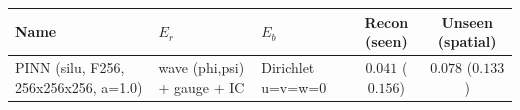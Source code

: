 \begin{center}
\begin{tabular}{lll cc}
\toprule
Name & $E_r$ & $E_b$ & Recon (seen) & Unseen (spatial) \\
\midrule
PINN (silu, F256, 256x256x256, a=1.0) & wave (phi,psi) + gauge + IC & Dirichlet u=v=w=0 & $0.041$ ($0.156$) & $0.078$ ($0.133$) \\
\bottomrule
\end{tabular}
\end{center}
